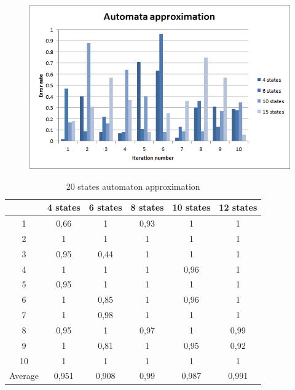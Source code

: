 \documentclass[runningheads,a4paper]{llncs}
\begin{document}
\begin{figure}
\includegraphics[scale=1]{chart.png}
\end{figure}

\begin{table}[]
\centering
\caption{20 states automaton approximation}
\label{my-label}
\begin{tabular}{@{}cccccc@{}}
\toprule
        & 4 states & 6 states & 8 states & 10 states & 12 states    \\ \midrule
1       & 0,66     & 1        & 0,93     & 1         & 1 \\
2       & 1        & 1        & 1        & 1         & 1 \\
3       & 0,95     & 0,44     & 1        & 1         & 1 \\
4       & 1        & 1        & 1        & 0,96      & 1   \\
5       & 0,95     & 1        & 1        & 1         & 1   \\
6       & 1        & 0,85     & 1        & 0,96      & 1    \\
7       & 1        & 0,98     & 1        & 1         & 1    \\
8       & 0,95     & 1        & 0,97     & 1         & 0,99     \\
9       & 1        & 0,81     & 1        & 0,95      & 0,92 \\
10      & 1        & 1        & 1        & 1         & 1  \\
Average & 0,951    & 0,908    & 0,99     & 0,987     & 0,991  \\ \bottomrule
\end{tabular}
\end{table}
\end{document}
